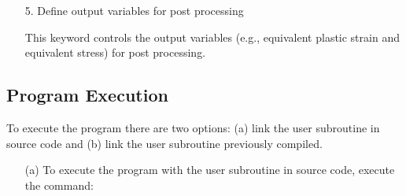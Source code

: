\documentclass[11pt,a4paper,twoside,final,onecolumn,titlepage]{article}
\begin{document}
\begin{enumerate}
	\item[5.] Define output variables for post processing
	\item[] This keyword controls the output variables (e.g., equivalent plastic strain and equivalent stress) for post processing.\\
	\par
	\texttt{}	
	\par\bigskip
\end{enumerate}

\vspace{0.2cm}
\subsection{Program Execution}
\vspace{0.2cm}

To execute the program there are two options: (a) link the user subroutine in source code and (b) link the user subroutine previously compiled.

\begin{enumerate}
	\item[(a)] To execute the program with the user subroutine in source code, execute the command:\\
	\par
	\texttt{}
	\par\bigskip
\end{enumerate}
\end{document}
